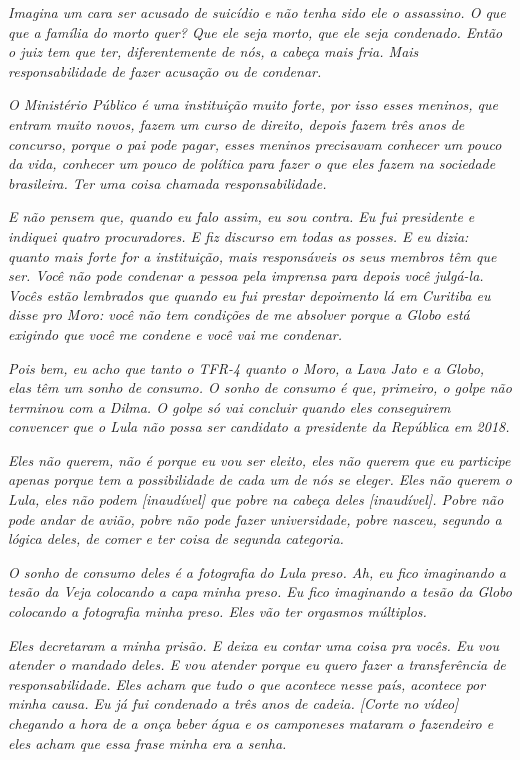 \emph{Imagina um cara ser acusado de suicídio e não tenha sido ele o
assassino. O que que a família do morto quer? Que ele seja morto, que
ele seja condenado. Então o juiz tem que ter, diferentemente de nós, a
cabeça mais fria. Mais responsabilidade de fazer acusação ou de
condenar.}

\emph{O Ministério Público é uma instituição muito forte, por isso esses
meninos, que entram muito novos, fazem um curso de direito, depois fazem
três anos de concurso, porque o pai pode pagar, esses meninos precisavam
conhecer um pouco da vida, conhecer um pouco de política para fazer o
que eles fazem na sociedade brasileira. Ter uma coisa chamada
responsabilidade.}

\emph{E não pensem que, quando eu falo assim, eu sou contra. Eu fui
presidente e indiquei quatro procuradores. E fiz discurso em todas as
posses. E eu dizia: quanto mais forte for a instituição, mais
responsáveis os seus membros têm que ser. Você não pode condenar a
pessoa pela imprensa para depois você julgá-la. Vocês estão lembrados
que quando eu fui prestar depoimento lá em Curitiba eu disse pro Moro:
você não tem condições de me absolver porque a Globo está exigindo que
você me condene e você vai me condenar.~}

\emph{Pois bem, eu acho que tanto o TFR-4 quanto o Moro, a Lava Jato e a
Globo, elas têm um sonho de consumo. O sonho de consumo é que, primeiro,
o golpe não terminou com a Dilma. O golpe só vai concluir quando eles
conseguirem convencer que o Lula não possa ser candidato a presidente da
República em 2018.}

\emph{Eles não querem, não é porque eu vou ser eleito, eles não querem
que eu participe apenas porque tem a possibilidade de cada um de nós se
eleger. Eles não querem o Lula, eles não podem {[}inaudível{]} que pobre
na cabeça deles {[}inaudível{]}. Pobre não pode andar de avião, pobre
não pode fazer universidade, pobre nasceu, segundo a lógica deles, de
comer e ter coisa de segunda categoria.~}

\emph{O sonho de consumo deles é a fotografia do Lula preso. Ah, eu fico
imaginando a tesão da Veja colocando a capa minha preso. Eu fico
imaginando a tesão da Globo colocando a fotografia minha preso. Eles vão
ter orgasmos múltiplos.~}

\emph{Eles decretaram a minha prisão. E deixa eu contar uma coisa pra
vocês. Eu vou atender o mandado deles. E vou atender porque eu quero
fazer a transferência de responsabilidade. Eles acham que tudo o que
acontece nesse país, acontece por minha causa. Eu já fui condenado a
três anos de cadeia. {[}Corte no vídeo{]} chegando a hora de a onça
beber água e os camponeses mataram o fazendeiro e eles acham que essa
frase minha era a senha.~}


